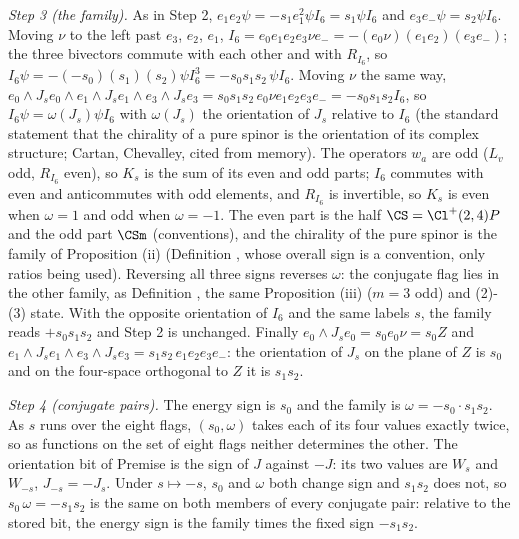 \emph{Step 3 (the family).} As in Step 2, $e_{1}e_{2}\psi = -s_{1}e_{1}^{2}\psi I_{6} = s_{1}\psi I_{6}$ and $e_{3}e_{-}\psi = s_{2}\psi I_{6}$. Moving $\nu$ to the left past $e_{3}$, $e_{2}$, $e_{1}$, $I_{6} = e_{0}e_{1}e_{2}e_{3}\nu e_{-} = -(e_{0}\nu)(e_{1}e_{2})(e_{3}e_{-})$; the three bivectors commute with each other and with $R_{I_{6}}$, so $I_{6}\psi = -(-s_{0})(s_{1})(s_{2})\psi I_{6}^{3} = -s_{0}s_{1}s_{2}\,\psi I_{6}$. Moving $\nu$ the same way, $e_{0}\wedge J_{s}e_{0}\wedge e_{1}\wedge J_{s}e_{1}\wedge e_{3}\wedge J_{s}e_{3} = s_{0}s_{1}s_{2}\,e_{0}\nu e_{1}e_{2}e_{3}e_{-} = -s_{0}s_{1}s_{2}I_{6}$, so $I_{6}\psi = \omega(J_{s})\psi I_{6}$ with $\omega(J_{s})$ the orientation of $J_{s}$ relative to $I_{6}$ (the standard statement that the chirality of a pure spinor is the orientation of its complex structure; Cartan, Chevalley, cited from memory). The operators $w_{a}$ are odd ($L_{v}$ odd, $R_{I_{6}}$ even), so $K_{s}$ is the sum of its even and odd parts; $I_{6}$ commutes with even and anticommutes with odd elements, and $R_{I_{6}}$ is invertible, so $K_{s}$ is even when $\omega = 1$ and odd when $\omega = -1$. The even part is the half $\CS = \Cl^{+}(2,4)P$ and the odd part $\CSm$ (conventions), and the chirality of the pure spinor is the family of Proposition (ii) (Definition , whose overall sign is a convention, only ratios being used). Reversing all three signs reverses $\omega$: the conjugate flag lies in the other family, as Definition , the same Proposition (iii) ($m = 3$ odd) and (2)-(3) state. With the opposite orientation of $I_{6}$ and the same labels $s$, the family reads $+s_{0}s_{1}s_{2}$ and Step 2 is unchanged. Finally $e_{0}\wedge J_{s}e_{0} = s_{0}e_{0}\nu = s_{0}Z$ and $e_{1}\wedge J_{s}e_{1}\wedge e_{3}\wedge J_{s}e_{3} = s_{1}s_{2}\,e_{1}e_{2}e_{3}e_{-}$: the orientation of $J_{s}$ on the plane of $Z$ is $s_{0}$ and on the four-space orthogonal to $Z$ it is $s_{1}s_{2}$.

\emph{Step 4 (conjugate pairs).} The energy sign is $s_{0}$ and the family is $\omega = -s_{0}\cdot s_{1}s_{2}$. As $s$ runs over the eight flags, $(s_{0}, \omega)$ takes each of its four values exactly twice, so as functions on the set of eight flags neither determines the other. The orientation bit of Premise  is the sign of $J$ against $-J$: its two values are $W_{s}$ and $W_{-s}$, $J_{-s} = -J_{s}$. Under $s \mapsto -s$, $s_{0}$ and $\omega$ both change sign and $s_{1}s_{2}$ does not, so $s_{0}\,\omega = -s_{1}s_{2}$ is the same on both members of every conjugate pair: relative to the stored bit, the energy sign is the family times the fixed sign $-s_{1}s_{2}$.

